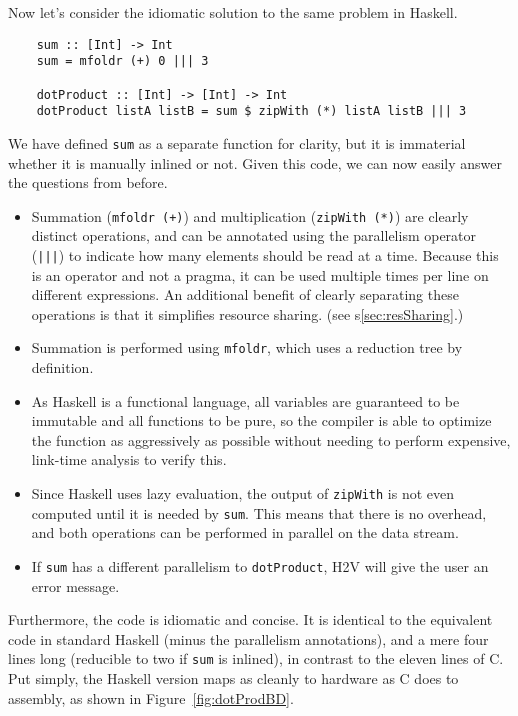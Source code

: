 \documentclass[english,onecolumn]{scrartcl}
\begin{document}
Now let's consider the idiomatic solution to the same problem in Haskell.

\begin{lstlisting}
    sum :: [Int] -> Int
    sum = mfoldr (+) 0 ||| 3

    dotProduct :: [Int] -> [Int] -> Int
    dotProduct listA listB = sum $ zipWith (*) listA listB ||| 3
\end{lstlisting}

We have defined \texttt{sum} as a separate function for clarity, but it is immaterial whether it is manually inlined or not.
Given this code, we can now easily answer the questions from before.
\begin{itemize}
    \item Summation (\texttt{mfoldr (+)}) and multiplication (\texttt{zipWith (*)}) are clearly distinct operations,
        and can be annotated using the parallelism operator (\texttt{|||}) to indicate how many elements should be read at a time.
        Because this is an operator and not a pragma, it can be used multiple times per line on different expressions.
        An additional benefit of clearly separating these operations is that it simplifies resource sharing.
        (see s\ref{sec:resSharing}.)
    \item Summation is performed using \texttt{mfoldr}, which uses a reduction tree by definition.
    \item As Haskell is a functional language, all variables are guaranteed to be immutable and all functions to be pure,
        so the compiler is able to optimize the function as aggressively as possible without needing to perform expensive,
        link-time analysis to verify this.
    \item Since Haskell uses lazy evaluation, the output of \texttt{zipWith} is not even computed until it is needed by
        \texttt{sum}. This means that there is no overhead, and both operations can be performed in parallel on the data stream.
    \item If \texttt{sum} has a different parallelism to \texttt{dotProduct}, H2V will give the user an error message.
\end{itemize}

Furthermore, the code is idiomatic and concise. It is identical to the equivalent code in standard Haskell (minus the parallelism
annotations), and a mere four lines long (reducible to two if \texttt{sum} is inlined), in contrast to the eleven lines of C.
Put simply, the Haskell version maps as cleanly to hardware as C does to assembly, as shown in Figure~\ref{fig:dotProdBD}.
\end{document}
